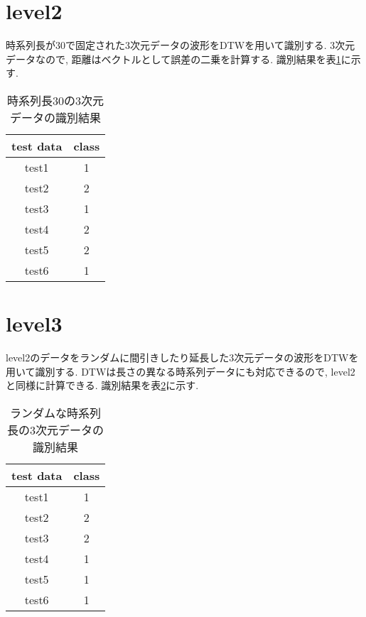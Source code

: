 	\section{level2}
	    時系列長が30で固定された3次元データの波形をDTWを用いて識別する.
        3次元データなので, 距離はベクトルとして誤差の二乗を計算する.
        識別結果を表\ref{tb:result2}に示す.

        \begin{table}[]
            \centering
            \caption{時系列長30の3次元データの識別結果}
            \begin{tabular}{|c|c|}
                \hline
                test data & class \\ \hline
                test1     & 1     \\ \hline
                test2     & 2     \\ \hline
                test3     & 1     \\ \hline
                test4     & 2     \\ \hline
                test5     & 2     \\ \hline
                test6     & 1     \\ \hline
            \end{tabular}
            \label{tb:result2}
        \end{table}

	\section{level3}
	    level2のデータをランダムに間引きしたり延長した3次元データの波形をDTWを用いて識別する.
        DTWは長さの異なる時系列データにも対応できるので, level2と同様に計算できる.
        識別結果を表\ref{tb:result3}に示す.


        \begin{table}[]
            \centering
            \caption{ランダムな時系列長の3次元データの識別結果}
            \begin{tabular}{|c|c|}
                \hline
                test data & class \\ \hline
                test1     & 1     \\ \hline
                test2     & 2     \\ \hline
                test3     & 2     \\ \hline
                test4     & 1     \\ \hline
                test5     & 1     \\ \hline
                test6     & 1     \\ \hline
            \end{tabular}
            \label{tb:result3}
        \end{table}

